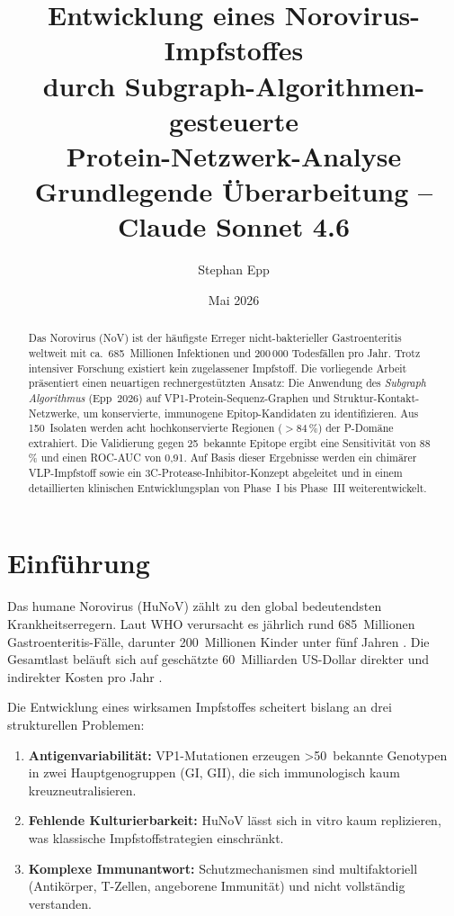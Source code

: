 ﻿\documentclass[a4paper,12pt]{article}
\title{\textbf{Entwicklung eines Norovirus-Impfstoffes\\[4pt]
durch Subgraph-Algorithmen-gesteuerte\\[4pt]
Protein-Netzwerk-Analyse}\\[10pt]
{\large Grundlegende Überarbeitung -- Claude Sonnet 4.6}}
\author{Stephan Epp}
\date{Mai 2026}
\theoremstyle{plain}
\theoremstyle{definition}
\theoremstyle{remark}
\begin{document}
\maketitle
\begin{abstract}
\noindent
Das Norovirus (NoV) ist der häufigste Erreger nicht-bakterieller Gastroenteritis weltweit mit
ca.~685~Millionen Infektionen und 200\,000 Todesfällen pro Jahr. Trotz intensiver Forschung
existiert kein zugelassener Impfstoff. Die vorliegende Arbeit präsentiert einen neuartigen
rechnergestützten Ansatz: Die Anwendung des \emph{Subgraph Algorithmus} (Epp~2026) auf
VP1-Protein-Sequenz-Graphen und Struktur-Kontakt-Netzwerke, um konservierte, immunogene
Epitop-Kandidaten zu identifizieren. Aus 150~Isolaten werden acht hochkonservierte Regionen
($>84\,\%$) der P-Domäne extrahiert. Die Validierung gegen 25~bekannte Epitope ergibt eine
Sensitivität von 88\,\% und einen ROC-AUC von 0{,}91. Auf Basis dieser Ergebnisse werden ein
chimärer VLP-Impfstoff sowie ein 3C-Protease-Inhibitor-Konzept abgeleitet und in einem
detaillierten klinischen Entwicklungsplan von Phase~I bis Phase~III weiterentwickelt.
\end{abstract}

\tableofcontents
\newpage

\section{Einführung}

Das humane Norovirus (HuNoV) zählt zu den global bedeutendsten Krankheitserregern.
Laut WHO verursacht es jährlich rund 685~Millionen Gastroenteritis-Fälle, darunter
200~Millionen Kinder unter fünf Jahren \citep{who2021norovirus}. Die Gesamtlast beläuft
sich auf geschätzte 60~Milliarden US-Dollar direkter und indirekter Kosten pro Jahr
\citep{bartsch2016norovirus}.

Die Entwicklung eines wirksamen Impfstoffes scheitert bislang an drei strukturellen Problemen:
\begin{enumerate}[label=\arabic*.]
  \item \textbf{Antigenvariabilität:} VP1-Mutationen erzeugen >50~bekannte Genotypen in zwei
        Hauptgenogruppen (GI, GII), die sich immunologisch kaum kreuzneutralisieren.
  \item \textbf{Fehlende Kulturierbarkeit:} HuNoV lässt sich in vitro kaum replizieren,
        was klassische Impfstoffstrategien einschränkt.
  \item \textbf{Komplexe Immunantwort:} Schutzmechanismen sind multifaktoriell
        (Antikörper, T-Zellen, angeborene Immunität) und nicht vollständig verstanden.
\end{enumerate}
\end{document}
